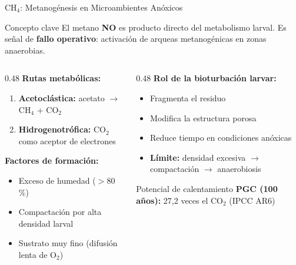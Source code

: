 \documentclass[aspectratio=169, 11pt]{beamer}
\begin{document}
\begin{frame}{CH$_4$: Metanogénesis en Microambientes Anóxicos}
\begin{alertblock}{Concepto clave}
El metano \textbf{NO} es producto directo del metabolismo larval. Es señal de \textbf{fallo operativo}: activación de arqueas metanogénicas en zonas anaerobias.
\end{alertblock}
\vspace{0.2cm}
\begin{columns}[T]
\begin{column}{0.48\textwidth}
\textbf{Rutas metabólicas:}
\begin{enumerate}
    \item \textbf{Acetoclástica:} acetato $\rightarrow$ CH$_4$ + CO$_2$
    \item \textbf{Hidrogenotrófica:} CO$_2$ como aceptor de electrones
\end{enumerate}
\vspace{0.2cm}
\textbf{Factores de formación:}
\begin{itemize}
    \item Exceso de humedad ($>$80\,\%)
    \item Compactación por alta densidad larval
    \item Sustrato muy fino (difusión lenta de O$_2$)
\end{itemize}
\end{column}
\begin{column}{0.48\textwidth}
\textbf{Rol de la bioturbación larvar:}
\begin{itemize}
    \item Fragmenta el residuo
    \item Modifica la estructura porosa
    \item Reduce tiempo en condiciones anóxicas
    \item \textcolor{rojoAlerta}{\textbf{Límite:}} densidad excesiva $\rightarrow$ compactación $\rightarrow$ anaerobiosis
\end{itemize}
\vspace{0.2cm}
\begin{exampleblock}{Potencial de calentamiento}
\textbf{PGC (100 años):} 27,2 veces el CO$_2$ (IPCC AR6)
\end{exampleblock}
\end{column}
\end{columns}
\end{frame}
\end{document}
